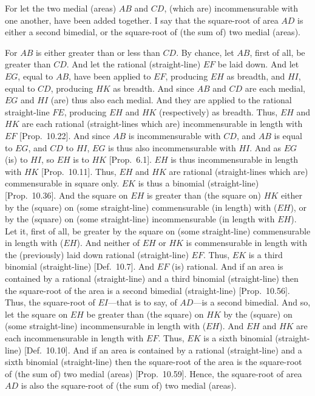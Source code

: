 \epsfysize=2in 
\centerline{}

For let the two medial (areas) $AB$ and $CD$, (which are) incommensurable
with one another, have been added together. I say that the square-root
of area $AD$ is either a second bimedial, or the square-root of (the sum of)
two medial (areas).

For $AB$ is either greater than or less than $CD$. By chance, let $AB$,
first of all,  be greater than $CD$. And let the rational (straight-line)
$EF$ be laid down. And let $EG$, equal to $AB$, have been applied
to $EF$, producing $EH$ as breadth, and $HI$, equal to $CD$, producing
$HK$ as breadth. And since $AB$ and $CD$ are each medial,
$EG$ and $HI$ (are) thus also each medial. And they are applied to
the rational straight-line $FE$, producing $EH$ and $HK$ (respectively) as breadth. Thus, $EH$ and $HK$ are  each rational (straight-lines which are) incommensurable in length with $EF$ [Prop.~10.22]. And since $AB$ is incommensurable
with $CD$, and $AB$ is equal to $EG$, and $CD$ to $HI$, $EG$
is thus also incommensurable with $HI$. And as $EG$ (is) to $HI$,
so $EH$ is to $HK$ [Prop.~6.1].  $EH$ is thus
incommensurable in length with $HK$ [Prop.~10.11]. Thus, $EH$ and $HK$ are rational
(straight-lines which are) commensurable in square only. $EK$
is thus a binomial (straight-line) [Prop.~10.36]. 
And the square on $EH$ is  greater than (the square on) $HK$
either by the (square) on (some straight-line) commensurable (in length) with ($EH$), or
by the (square) on (some straight-line) incommensurable (in length
with $EH$). Let it, first of all, be greater by the square on (some
straight-line) commensurable in length with ($EH$). And neither of
$EH$ or $HK$ is commensurable in length with the (previously)
laid down rational (straight-line) $EF$.  Thus, $EK$ is a third
binomial (straight-line) [Def.~10.7]. And $EF$
(is) rational. And if an area is contained by a rational (straight-line) and
a third binomial (straight-line)  then the square-root of the area
is a second bimedial  (straight-line) [Prop.~10.56]. Thus,
the square-root of $EI$---that is to say, of $AD$---is a second bimedial.
And so, let the square on $EH$ be greater than (the square) on $HK$
by the (square)  on (some straight-line) incommensurable in length
with ($EH$).  And $EH$ and $HK$
are each incommensurable
in length with $EF$. Thus, $EK$ is a sixth binomial (straight-line)
[Def.~10.10]. And if an area
is contained by
a rational (straight-line) and a sixth binomial (straight-line)  then the square-root of the area is the square-root of (the sum of) two medial (areas) 
[Prop.~10.59]. Hence, the
square-root of area $AD$ is also the square-root of (the sum of)
two medial (areas).

